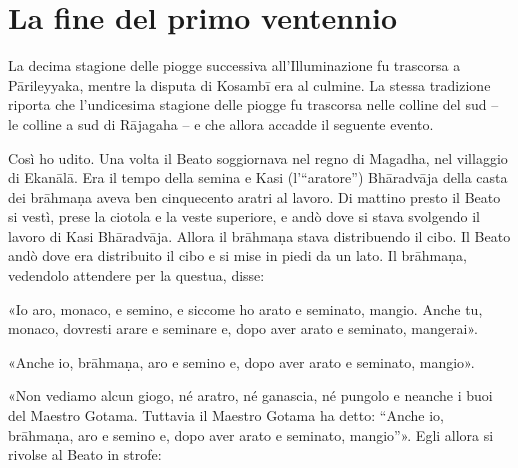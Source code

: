 \chapter{La fine del primo ventennio}

 La decima stagione delle piogge successiva
all’Illuminazione fu trascorsa a Pārileyyaka, mentre la disputa di Kosambī era
al culmine. La stessa tradizione riporta che l’undicesima stagione delle piogge
fu trascorsa nelle colline del sud – le colline a sud di Rājagaha – e che allora
accadde il seguente evento.

 Così ho udito. Una volta il Beato soggiornava nel regno di
Magadha, nel villaggio di Ekanālā. Era il tempo della semina e Kasi
(l’“aratore”) Bhāradvāja della casta dei brāhmaṇa aveva ben cinquecento aratri
al lavoro. Di mattino presto il Beato si vestì, prese la ciotola e la veste
superiore, e andò dove si stava svolgendo il lavoro di Kasi Bhāradvāja. Allora
il brāhmaṇa stava distribuendo il cibo. Il Beato andò dove era distribuito il
cibo e si mise in piedi da un lato. Il brāhmaṇa, vedendolo attendere per la
questua, disse:

«Io aro, monaco, e semino, e siccome ho arato e seminato, mangio. Anche tu,
monaco, dovresti arare e seminare e, dopo aver arato e seminato, mangerai».

«Anche io, brāhmaṇa, aro e semino e, dopo aver arato e seminato, mangio».

«Non vediamo alcun giogo, né aratro, né ganascia, né pungolo e neanche i buoi
del Maestro Gotama. Tuttavia il Maestro Gotama ha detto: “Anche io, brāhmaṇa,
aro e semino e, dopo aver arato e seminato, mangio”». Egli allora si rivolse al
Beato in strofe:

